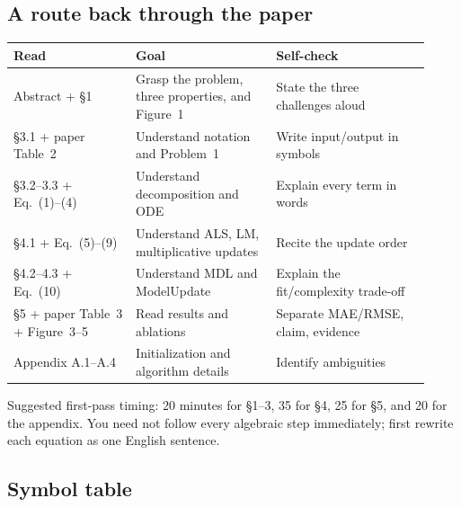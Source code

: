 \subsection*{A route back through the paper}

\begin{center}
\small
\begin{tabular}{@{}>{\raggedright\arraybackslash}p{0.27\linewidth}>{\raggedright\arraybackslash}p{0.31\linewidth}>{\raggedright\arraybackslash}p{0.34\linewidth}@{}}
  \toprule
  Read & Goal & Self-check \\
  \midrule
  Abstract + §1 & Grasp the problem, three properties, and Figure~1 & State the three challenges aloud \\
  §3.1 + paper Table~2 & Understand notation and Problem~1 & Write input/output in symbols \\
  §3.2--3.3 + Eq.~(1)--(4) & Understand decomposition and ODE & Explain every term in words \\
  §4.1 + Eq.~(5)--(9) & Understand ALS, LM, multiplicative updates & Recite the update order \\
  §4.2--4.3 + Eq.~(10) & Understand MDL and ModelUpdate & Explain the fit/complexity trade-off \\
  §5 + paper Table~3 + Figure~3--5 & Read results and ablations & Separate MAE/RMSE, claim, evidence \\
  Appendix A.1--A.4 & Initialization and algorithm details & Identify ambiguities \\
  \bottomrule
\end{tabular}
\end{center}

Suggested first-pass timing: 20 minutes for §1--3, 35 for §4, 25 for §5, and 20 for the appendix. You
need not follow every algebraic step immediately; first rewrite each equation as one English sentence.

\subsection*{Symbol table}


